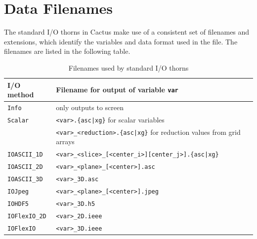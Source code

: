 \documentclass{article}
\begin{document}
\section{Data Filenames}

The standard I/O thorns in Cactus make use of a consistent set of filenames
and extensions, which identify the variables and data format used in the file.
The filenames are listed in the following table.

\begin{table}[htb]
\begin{center}
\label{filename_table}
\begin{tabular}{|l|l|}
  \hline
  {\bf I/O method}   & {\bf Filename for output of variable {\tt var}}\\
  \hline
  {\tt Info}         & only outputs to screen\\
  {\tt Scalar}       & {\tt <var>.\{asc|xg\}} for scalar variables\\
                     & {\tt <var>\_<reduction>.\{asc|xg\}} for reduction values from grid arrays\\
  {\tt IOASCII\_1D}  & {\tt <var>\_<slice>\_[<center\_i>][center\_j>].\{asc|xg\}}\\
  {\tt IOASCII\_2D}  & {\tt <var>\_<plane>\_[<center>].asc}\\
  {\tt IOASCII\_3D}  & {\tt <var>\_3D.asc}\\
  {\tt IOJpeg}       & {\tt <var>\_<plane>\_[<center>].jpeg}\\
  {\tt IOHDF5}       & {\tt <var>\_3D.h5}\\
  {\tt IOFlexIO\_2D} & {\tt <var>\_2D.ieee}\\
  {\tt IOFlexIO}     & {\tt <var>\_3D.ieee}\\
  \hline
\end{tabular}
\caption{Filenames used by standard I/O thorns}
\end{center}
\end{table}

\end{document}
